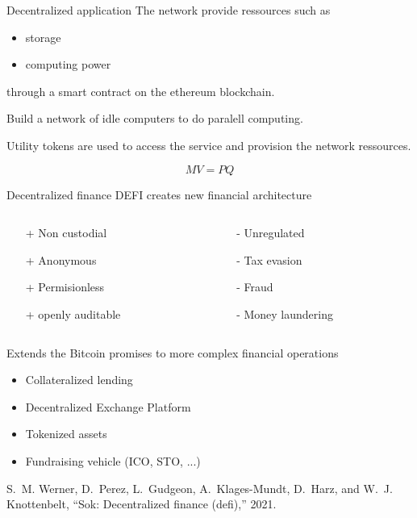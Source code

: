 \documentclass{beamer}
\begin{document}
\begin{frame}{Decentralized application}
The network provide ressources such as
\begin{itemize}
  \item storage
  \item computing power
\end{itemize}
through a smart contract on the ethereum blockchain. 
\vspace{0.3cm}
\begin{tcolorbox}[enhanced,drop shadow, title=GOLEM (\url{https://www.golem.network/})]
    Build a network of idle computers to do paralell computing. 
\end{tcolorbox}
Utility tokens are used to access the service and provision the network ressources.
\begin{tcolorbox}[enhanced,drop shadow, title=Equation of Exchange (Fisher 1911)]
    \[MV = PQ\] 
\end{tcolorbox}
\end{frame}
\begin{frame}{Decentralized finance}
DEFI creates new financial architecture
\begin{columns}
\begin{column}{0.5\textwidth}
\begin{itemize}
\item[+] Non custodial
\item[+] Anonymous
\item[+] Permisionless
\item[+] openly auditable
\end{itemize}
\end{column}
\begin{column}{0.5\textwidth} 
\begin{itemize}
\item[-] Unregulated
\item[-] Tax evasion
\item[-] Fraud
\item[-] Money laundering
\end{itemize} 
\end{column}
\end{columns}
\vspace{0.5cm}
Extends the Bitcoin promises to more complex financial operations
\begin{itemize}
  \item Collateralized lending
  \item Decentralized Exchange Platform
  \item Tokenized assets
  \item Fundraising vehicle (ICO, STO, ...)
\end{itemize}
\vspace{0.3cm}
\scriptsize
\begin{thebibliography}{1}

S.~M. Werner, D.~Perez, L.~Gudgeon, A.~Klages-Mundt, D.~Harz, and W.~J.
  Knottenbelt, ``Sok: Decentralized finance (defi),'' 2021.

\end{thebibliography}

\end{frame}
\end{document}
